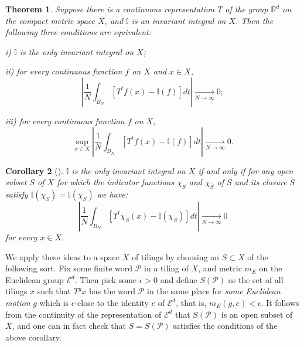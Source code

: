 \documentclass[reqno]{stml-l}
\theoremstyle{plain}
\newtheorem{theorem}{Theorem}[chapter]
\newtheorem{corollary}[theorem]{Corollary}
\theoremstyle{definition}
\numberwithin{equation}{chapter}
\begin{document}
\begin{theorem}\label{ch04:thm4.2}
Suppose there is a continuous representation $T$ of the group $\mathbb{R}^{d}$ on the compact metric space $X$, and $\mathbb{I}$ is an invariant integral on $X$. Then the following three conditions are equivalent:

i) $\mathbb{I}$ is the only invariant integral on $X$;

ii) for every continuous function $f$ on $X$ and $x\in X$,
\begin{equation}\label{ch04:eqn4.5}
|\frac{1}{N}\int_{B_{N}}[T^{t}f(x)-\mathbb{I}(f)]dt|\mathop{\longrightarrow}\limits_{N\rightarrow\infty}0;
\end{equation}

iii) for every continuous function $f$ on $X$,
\begin{equation}\label{ch04:eqn4.6}
\sup\limits_{x\in X}|\frac{1}{N}\int_{B_{N}}[T^{t}f(x)-\mathbb{I}(f)]dt|\mathop{\longrightarrow}\limits_{N\rightarrow\infty}0.
\end{equation}
\end{theorem}

\begin{corollary}[{\cite[p. 271]{bib:Pet}}]\label{ch04:cor4.3}
$\mathbb{I}$ is the only invariant integral on $X$ if and only if for any open subset $S$ of $X$ for which the indicator functions $\chi_{S}$ and $\chi_{\bar{S}}$ of $S$ and its closure $\bar{S}$ satisfy $\mathbb{I}(\chi_{S})=\mathbb{I}(\chi_{\bar{S}})$ we have:
\begin{equation}\label{ch04:eqn4.7}
|\frac{1}{N}\int_{B_{N}}[T^{t}\chi_{S}(x)-\mathbb{I}(\chi_{S})]dt|\mathop{\longrightarrow}\limits_{N\rightarrow\infty}0
\end{equation}
for every $x\in X$.
\end{corollary}

We apply these ideas to a space $X$ of tilings by choosing an $S\subset X$ of the following sort. Fix some finite word $\mathcal{P}$ in a tiling of $X$, and metric $m_{E}$ on the Euclidean group $\mathcal{E}^{d}$. Then pick some $\epsilon>0$ and define $S(\mathcal{P})$ as the set of all tilings $x$ such that $T^{g}x$ has the word $\mathcal{P}$ in the same place for \emph{some Euclidean motion} $g$ which is $\epsilon$-close to the identity $e$ of $\mathcal{E}^{d}$, that is, $m_{E}(g, e)<\epsilon$. It follows from the continuity of the representation of $\mathcal{E}^{d}$ that $S(\mathcal{P})$ is an open subset of $X$, and one can in fact check that $S=S(\mathcal{P})$ satisfies the conditions of the above corollary.
\end{document}
